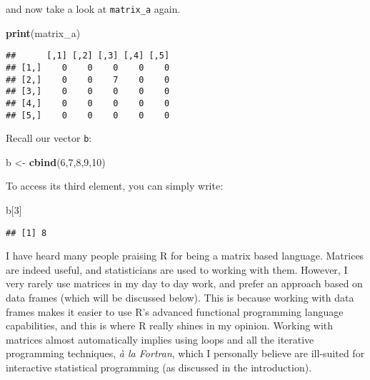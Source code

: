 \documentclass[
]{article}
\newenvironment{Shaded}{\begin{snugshade}}{\end{snugshade}}
\newcommand{\DecValTok}[1]{\textcolor[rgb]{0.00,0.00,0.81}{#1}}
\newcommand{\KeywordTok}[1]{\textcolor[rgb]{0.13,0.29,0.53}{\textbf{#1}}}
\newcommand{\NormalTok}[1]{#1}
\newcommand{\StringTok}[1]{\textcolor[rgb]{0.31,0.60,0.02}{#1}}
\begin{document}
and now take a look at \texttt{matrix\_a} again.

\begin{Shaded}
\begin{Highlighting}[]
\KeywordTok{print}\NormalTok{(matrix\_a)}
\end{Highlighting}
\end{Shaded}

\begin{verbatim}
##      [,1] [,2] [,3] [,4] [,5]
## [1,]    0    0    0    0    0
## [2,]    0    0    7    0    0
## [3,]    0    0    0    0    0
## [4,]    0    0    0    0    0
## [5,]    0    0    0    0    0
\end{verbatim}

Recall our vector \texttt{b}:

\begin{Shaded}
\begin{Highlighting}[]
\NormalTok{b \textless{}{-}}\StringTok{ }\KeywordTok{cbind}\NormalTok{(}\DecValTok{6}\NormalTok{,}\DecValTok{7}\NormalTok{,}\DecValTok{8}\NormalTok{,}\DecValTok{9}\NormalTok{,}\DecValTok{10}\NormalTok{)}
\end{Highlighting}
\end{Shaded}

To access its third element, you can simply write:

\begin{Shaded}
\begin{Highlighting}[]
\NormalTok{b[}\DecValTok{3}\NormalTok{]}
\end{Highlighting}
\end{Shaded}

\begin{verbatim}
## [1] 8
\end{verbatim}

I have heard many people praising R for being a matrix based language. Matrices are indeed useful,
and statisticians are used to working with them. However, I very rarely use matrices in my
day to day work, and prefer an approach based on data frames (which will be discussed below). This
is because working with data frames makes it easier to use R's advanced functional programming
language capabilities, and this is where R really shines in my opinion. Working with matrices
almost automatically implies using loops and all the iterative programming techniques, \emph{à la Fortran},
which I personally believe are ill-suited for interactive statistical programming (as discussed in
the introduction).
\end{document}
